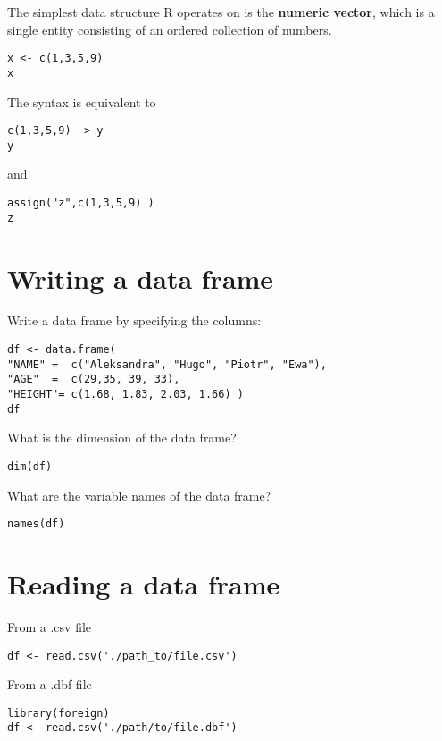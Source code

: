 \documentclass[11pt]{article}
\begin{document}
The simplest data structure R operates on is the \textbf{numeric vector}, which
is a single entity consisting of an ordered collection of numbers.

\begin{verbatim}
x <- c(1,3,5,9)
x
\end{verbatim}

The syntax is equivalent to 
\begin{verbatim}
c(1,3,5,9) -> y
y
\end{verbatim}

and 
\begin{verbatim}
assign("z",c(1,3,5,9) )
z
\end{verbatim}

\section{Writing a data frame}
\label{sec:orgda2cfae}

Write a data frame by specifying the columns:

\begin{verbatim}
df <- data.frame(
"NAME" =  c("Aleksandra", "Hugo", "Piotr", "Ewa"),
"AGE"  =  c(29,35, 39, 33),
"HEIGHT"= c(1.68, 1.83, 2.03, 1.66) )
df
\end{verbatim}



What is the dimension of the data frame?
\begin{verbatim}
dim(df)
\end{verbatim}

What are the variable names of the data frame?
\begin{verbatim}
names(df)
\end{verbatim}


\section{Reading a data frame}
\label{sec:org2c6a6a3}

From a .csv file

\begin{verbatim}
df <- read.csv('./path_to/file.csv')
\end{verbatim}



From a .dbf file
\begin{verbatim}
library(foreign)
df <- read.csv('./path/to/file.dbf')
\end{verbatim}
\end{document}
